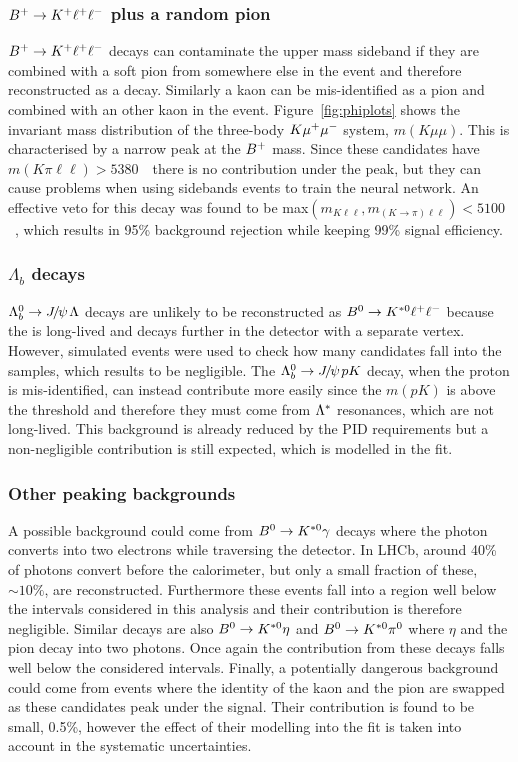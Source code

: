 \subsubsection{${{B}^+} \rightarrow K^+ \ell^+ \ell^-$ plus a random pion}

${{B}^+} \rightarrow K^+ \ell^+ \ell^-$ decays can contaminate the upper \Bz mass sideband if they are combined
with a soft pion from somewhere else in the event and therefore reconstructed as a \Bz decay.
Similarly a kaon can be mis-identified as a pion and combined with an other kaon in the event.
Figure~\ref{fig:phiplots} shows the invariant mass distribution of the three-body $K{\mu^+\mu^-}$ system,
$m(K\mu\mu)$. This is characterised by a narrow peak at the ${{B}^+}$ mass. Since these
candidates have $m(K\pi\ell\ell) > 5380$~\mevcc~there is no contribution under the \Bz peak,
but they can cause problems when using sidebands events to train the neural network.
An effective veto for this decay was found to be max$(m_{K\ell\ell},m_{(K\to\pi)\ell\ell}) < 5100$~\mevcc,
which results in 95\% background rejection while keeping 99\% signal efficiency.

\subsubsection{$\Lambda_b$ decays}

$\Lb\to\jpsi\Lz$ decays are unlikely to be reconstructed as ${{B}^0} \rightarrow {\ensuremath{{K}^{*0}}} \ell^+ \ell^-$ because
the \Lz is long-lived and decays further in the detector with a separate vertex.
However, simulated events were used to check how many candidates fall into the \Bz samples, which results to be negligible. 
The $\Lb\to\jpsi pK$ decay, when the proton is mis-identified, can instead contribute more easily since the $m(pK)$ is above the \Lz threshold
and therefore they must come from ${\Lambda}^*$ resonances, which are not long-lived. This background is already
reduced by the PID requirements but a non-negligible contribution is still expected, 
which is modelled in the fit.

\subsubsection{Other peaking backgrounds}

A possible background could come from ${{B}^0} \rightarrow{\ensuremath{{K}^{*0}}}\gamma$ decays where the photon converts
into two electrons while traversing the detector. In LHCb, around 40\% of photons convert before the calorimeter,
but only a small fraction of these, $\sim 10\%$, are reconstructed. Furthermore these events fall
into a \qsq region well below the intervals considered in this analysis and their contribution is therefore negligible.
Similar decays are also $\Bz \to\Kstarz\eta$ and $\Bz \to\Kstarz\pi^0$ where $\eta$ and the pion decay into
two photons. Once again the contribution from these decays falls well below the considered \qsq intervals.
Finally, a potentially dangerous background could come from events where the
identity of the kaon and the pion are swapped as these candidates peak under the signal.
Their contribution is found to be small, 0.5\%, however the effect of their modelling into the fit
is taken into account in the systematic uncertainties.

